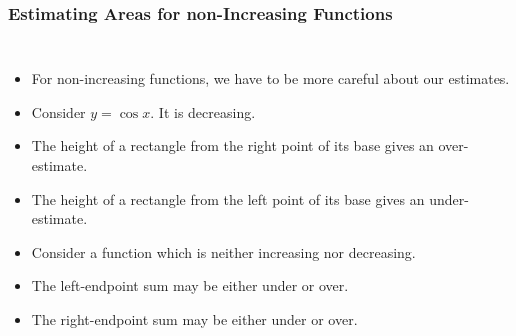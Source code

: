\documentclass[serif,ignorenonframetext]{beamer}
\begin{document}
\begin{frame}
\begin{columns}
  \end{columns}
\end{frame}

\begin{frame}
  \frametitle{Estimating Areas for non-Increasing Functions}
  \begin{columns}
  \begin{itemize}[<+->]
  \item For non-increasing functions, we have to be more
    careful about our estimates.
  \item Consider $y=\cos x$.  It is decreasing.
  \item The height of a rectangle from the right point of its
    base gives an over-estimate.
  \item The height of a rectangle from the left point of its
    base gives an under-estimate.
  \item Consider a function which is neither increasing nor decreasing.
  \item The left-endpoint sum may be either under or over.
  \item The right-endpoint sum may be either under or over.
  \end{itemize}

\end{columns}
\end{frame}
\end{document}
